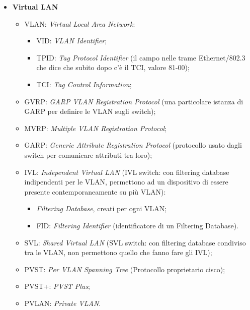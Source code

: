 \begin{itemize}
\begin{itemize}
\end{itemize}

\item{\textbf{Virtual LAN}}

\begin{itemize}

\item{VLAN}: \emph{Virtual Local Area Network}:

\begin{itemize}

\item{VID}: \emph{VLAN Identifier};
\item{TPID}: \emph{Tag Protocol Identifier} (il campo nelle trame Ethernet/802.3 che dice che subito dopo c’è il TCI, valore 81-00);
\item{TCI}: \emph{Tag Control Information};

\end{itemize}

\item{GVRP}: \emph{GARP VLAN Registration Protocol} (una particolare istanza di GARP per definire le VLAN sugli switch);
\item{MVRP}: \emph{Multiple VLAN Registration Protocol};
\item{GARP}: \emph{Generic Attribute Registration Protocol} (protocollo usato dagli switch per comunicare attributi tra loro);
\item{IVL}: \emph{Independent Virtual LAN} (IVL switch: con filtering database indipendenti per le VLAN, permettono ad un dispositivo di essere presente contemporaneamente su più VLAN):

\begin{itemize}

\item{\textit{Filtering Database}}, creati per ogni VLAN;
\item{FID}: \emph{Filtering Identifier} (identificatore di un Filtering Database).

\end{itemize}

\item{SVL}: \emph{Shared Virtual LAN} (SVL switch: con filtering database condiviso tra le VLAN, non permettono quello che fanno fare gli IVL);
\item{PVST}: \emph{Per VLAN Spanning Tree} (Protocollo proprietario cisco);
\item{PVST+}: \emph{PVST Plus};
\item{PVLAN}: \emph{Private VLAN}.


\end{itemize}
\end{itemize}
